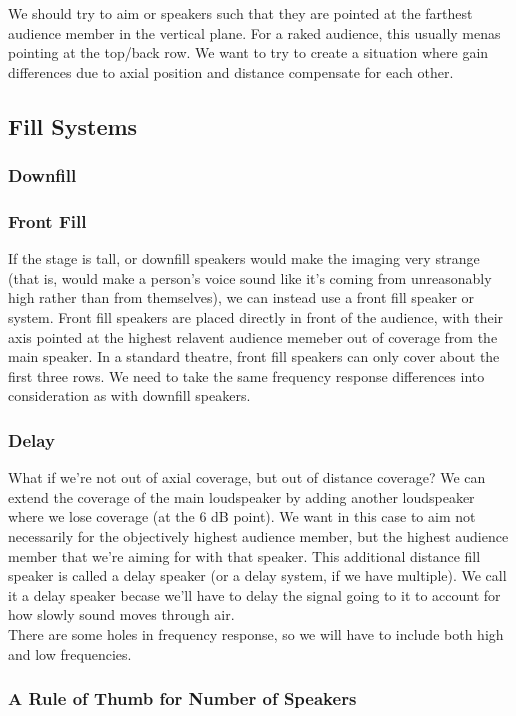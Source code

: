 \documentclass[a4paper]{article}
\begin{document}
We should try to aim or speakers such that they are pointed at the farthest
audience member in the vertical plane. For a raked audience, this usually menas
pointing at the top/back row. We want to try to create a situation where gain
differences due to axial position and distance compensate for each other.

\subsection{Fill Systems}
\subsubsection{Downfill}

\subsubsection{Front Fill}
If the stage is tall, or downfill speakers would make the imaging very strange
(that is, would make a person's voice sound like it's coming from unreasonably
high rather than from themselves), we can instead use a front fill speaker or
system. Front fill speakers are placed directly in front of the audience, with
their axis pointed at the highest relavent audience memeber out of coverage
from the main speaker. In a standard theatre, front fill speakers can only
cover about the first three rows. We need to take the same frequency response
differences into consideration as with downfill speakers.

\subsubsection{Delay}
What if we're not out of axial coverage, but out of distance coverage? We can
extend the coverage of the main loudspeaker by adding another loudspeaker where
we lose coverage (at the 6 dB point). We want in this case to aim not
necessarily for the objectively highest audience member, but the highest
audience member that we're aiming for with that speaker. This additional
distance fill speaker is called a delay speaker (or a delay system, if we have
multiple). We call it a delay speaker becase we'll have to delay the signal
going to it to account for how slowly sound moves through air.\\
There are some holes in frequency response, so we will have to include both
high %
and low frequencies.

\subsubsection{A Rule of Thumb for Number of Speakers}
\end{document}
